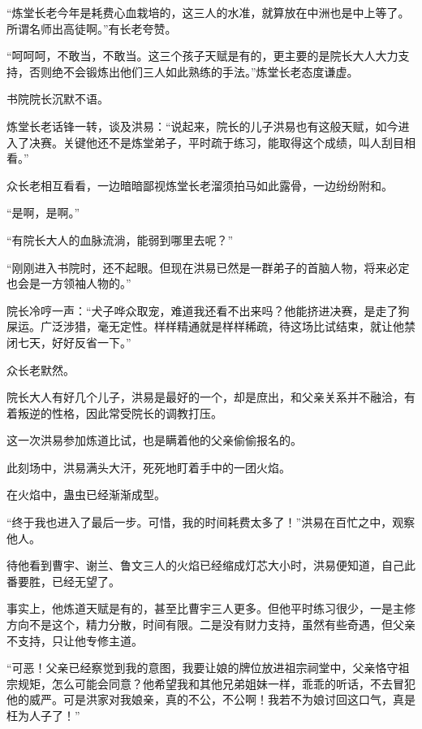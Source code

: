 
\begin{this_body}



“炼堂长老今年是耗费心血栽培的，这三人的水准，就算放在中洲也是中上等了。所谓名师出高徒啊。”有长老夸赞。

“呵呵呵，不敢当，不敢当。这三个孩子天赋是有的，更主要的是院长大人大力支持，否则绝不会锻炼出他们三人如此熟练的手法。”炼堂长老态度谦虚。

书院院长沉默不语。

炼堂长老话锋一转，谈及洪易：“说起来，院长的儿子洪易也有这般天赋，如今进入了决赛。关键他还不是炼堂弟子，平时疏于练习，能取得这个成绩，叫人刮目相看。”

众长老相互看看，一边暗暗鄙视炼堂长老溜须拍马如此露骨，一边纷纷附和。

“是啊，是啊。”

“有院长大人的血脉流淌，能弱到哪里去呢？”

“刚刚进入书院时，还不起眼。但现在洪易已然是一群弟子的首脑人物，将来必定也会是一方领袖人物的。”

院长冷哼一声：“犬子哗众取宠，难道我还看不出来吗？他能挤进决赛，是走了狗屎运。广泛涉猎，毫无定性。样样精通就是样样稀疏，待这场比试结束，就让他禁闭七天，好好反省一下。”

众长老默然。

院长大人有好几个儿子，洪易是最好的一个，却是庶出，和父亲关系并不融洽，有着叛逆的性格，因此常受院长的调教打压。

这一次洪易参加炼道比试，也是瞒着他的父亲偷偷报名的。

此刻场中，洪易满头大汗，死死地盯着手中的一团火焰。

在火焰中，蛊虫已经渐渐成型。

“终于我也进入了最后一步。可惜，我的时间耗费太多了！”洪易在百忙之中，观察他人。

待他看到曹宇、谢兰、鲁文三人的火焰已经缩成灯芯大小时，洪易便知道，自己此番要胜，已经无望了。

事实上，他炼道天赋是有的，甚至比曹宇三人更多。但他平时练习很少，一是主修方向不是这个，精力分散，时间有限。二是没有财力支持，虽然有些奇遇，但父亲不支持，只让他专修主道。

“可恶！父亲已经察觉到我的意图，我要让娘的牌位放进祖宗祠堂中，父亲恪守祖宗规矩，怎么可能会同意？他希望我和其他兄弟姐妹一样，乖乖的听话，不去冒犯他的威严。可是洪家对我娘亲，真的不公，不公啊！我若不为娘讨回这口气，真是枉为人子了！”


\end{this_body}
